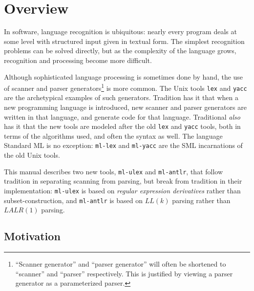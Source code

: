 \chapter{Overview}\label{chap:overview}

In software, language recognition is ubiquitous: nearly every program deals at some level with structured input given in textual form.  The simplest recognition problems can be solved directly, but as the complexity of the language grows, recognition and processing become more difficult.  

Although sophisticated language processing is sometimes done by hand, the use of scanner and parser generators\footnote{
  ``Scanner generator'' and ``parser generator'' will often be shortened to ``scanner'' and ``parser'' respectively.  This is justified by viewing a parser generator as a parameterized parser.
} is more common.  The Unix tools {\tt lex} and {\tt yacc} are the archetypical examples of such generators.  Tradition has it that when a new programming language is introduced, new scanner and parser generators are written in that language, and generate code for that language.  Traditional \emph{also} has it that the new tools are modeled after the old {\tt lex} and {\tt yacc} tools, both in terms of the algorithms used, and often the syntax as well.  The language Standard ML is no exception: {\tt ml-lex} and {\tt ml-yacc} are the SML incarnations of the old Unix tools.

This manual describes two new tools, {\tt ml-ulex} and {\tt ml-antlr}, that follow tradition in separating scanning from parsing, but break from tradition in their implementation: {\tt ml-ulex} is based on \emph{regular expression derivatives} rather than subset-construction, and {\tt ml-antlr} is based on $LL(k)$ parsing rather than $LALR(1)$ parsing.   

\section*{Motivation}

